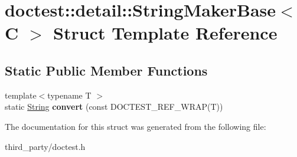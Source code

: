 \hypertarget{structdoctest_1_1detail_1_1_string_maker_base}{}\section{doctest\+::detail\+::String\+Maker\+Base$<$ C $>$ Struct Template Reference}
\label{structdoctest_1_1detail_1_1_string_maker_base}
\subsection*{Static Public Member Functions}
\begin{DoxyCompactItemize}
\item 
\mbox{\label{structdoctest_1_1detail_1_1_string_maker_base_a67d29f2a5de9a522d8e8607c1a39db9b}} 
{\footnotesize template$<$typename T $>$ }\\static \mbox{\hyperlink{classdoctest_1_1_string}{String}} {\bfseries convert} (const D\+O\+C\+T\+E\+S\+T\+\_\+\+R\+E\+F\+\_\+\+W\+R\+AP(T))
\end{DoxyCompactItemize}


The documentation for this struct was generated from the following file\+:\begin{DoxyCompactItemize}
\item 
third\+\_\+party/doctest.\+h\end{DoxyCompactItemize}
